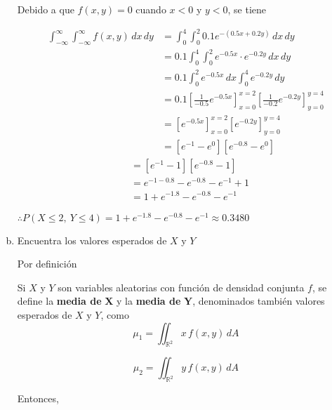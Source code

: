 \documentclass[12pt]{exam}
\begin{document}
\begin{questions}
\begin{enumerate}[a)]
    Debido a que $f(x,y)=0$ cuando $x<0$ y $y<0$, se tiene

    \begin{align*}
      \int_{-\infty}^{\infty} \int_{-\infty}^{\infty}f(x,y)\,dx\,dy
      &=\int_{0}^{4} \int_{0}^{2}0.1e^{-(0.5x+0.2y)}\,dx\,dy \\
      &=0.1 \int_{0}^{4} \int_{0}^{2}e^{-0.5x}\cdot e^{-0.2y}\,dx\,dy \\
      &=0.1 \int_{0}^{2} e^{-0.5x}\,dx \int_{0}^{4}e^{-0.2y}\,dy \\
      &= 0.1
      \left[\frac{1}{-0.5}e^{-0.5x}\right]_{x=0}^{x=2}
      \left[\frac{1}{-0.2}e^{-0.2y}\right]_{y=0}^{y=4} \\
      &= 
      \left[e^{-0.5x}\right]_{x=0}^{x=2}
      \left[e^{-0.2y}\right]_{y=0}^{y=4} \\
      &= 
      \left[e^{-1}-e^0\right]
      \left[e^{-0.8}-e^0\right] 
    \end{align*}
    \begin{align*}
      &= 
      \left[e^{-1}-1\right]
      \left[e^{-0.8}-1\right] \\
      &= e^{-1-0.8} - e^{-0.8} - e^{-1} + 1 \\
      &= 1 + e^{-1.8} - e^{-0.8} - e^{-1}
    \end{align*}

    $\therefore P(X \leq 2,~Y \leq 4) = 1 + e^{-1.8} - e^{-0.8} - e^{-1} \approx 0.3480$

  \item Encuentra los valores esperados de $X$ y $Y$

    Por definición

    \begin{tcolorbox}[colback=white, colframe=blue!40!black, title=\textbf{Valores Esperados}]
      Si $X$ y $Y$ son variables aleatorias con función de densidad conjunta $f$, se define la \textbf{media de} $\boldsymbol{X}$ y la \textbf{media de} $\boldsymbol{Y}$, denominados también valores esperados de $X$ y $Y$, como
      \begin{equation}
        \mu_1 = \iint_{\mathbb{R}^2}x\,f(x,y)\,dA
      \end{equation}
      
      \begin{equation}
        \mu_2 = \iint_{\mathbb{R}^2}y\,f(x,y)\,dA
      \end{equation}
    \end{tcolorbox}

    Entonces,


\end{enumerate}
\end{questions}
\end{document}

